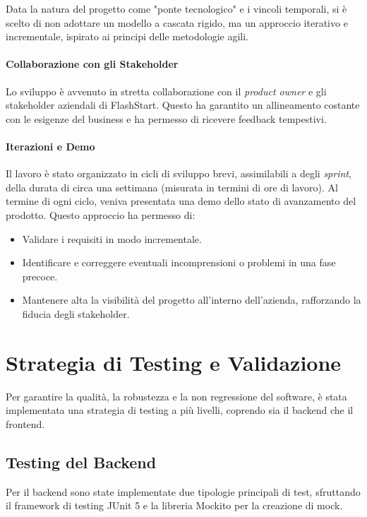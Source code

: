 \documentclass[12pt,a4paper,openright,twoside]{book}
\begin{document}
Data la natura del progetto come "ponte tecnologico" e i vincoli temporali, si è scelto di non adottare un modello a cascata rigido, ma un approccio iterativo e incrementale, ispirato ai principi delle metodologie agili.

\paragraph{Collaborazione con gli Stakeholder} Lo sviluppo è avvenuto in stretta collaborazione con il \textit{product owner} e gli stakeholder aziendali di FlashStart. Questo ha garantito un allineamento costante con le esigenze del business e ha permesso di ricevere feedback tempestivi.

\paragraph{Iterazioni e Demo} Il lavoro è stato organizzato in cicli di sviluppo brevi, assimilabili a degli \textit{sprint}, della durata di circa una settimana (misurata in termini di ore di lavoro). Al termine di ogni ciclo, veniva presentata una demo dello stato di avanzamento del prodotto. Questo approccio ha permesso di:
\begin{itemize}
    \item Validare i requisiti in modo incrementale.
    \item Identificare e correggere eventuali incomprensioni o problemi in una fase precoce.
    \item Mantenere alta la visibilità del progetto all'interno dell'azienda, rafforzando la fiducia degli stakeholder.
\end{itemize}

\section{Strategia di Testing e Validazione}
\label{sec:testing}
Per garantire la qualità, la robustezza e la non regressione del software, è stata implementata una strategia di testing a più livelli, coprendo sia il backend che il frontend.

\subsection{Testing del Backend}
Per il backend sono state implementate due tipologie principali di test, sfruttando il framework di testing JUnit 5 e la libreria Mockito per la creazione di mock.
\end{document}
